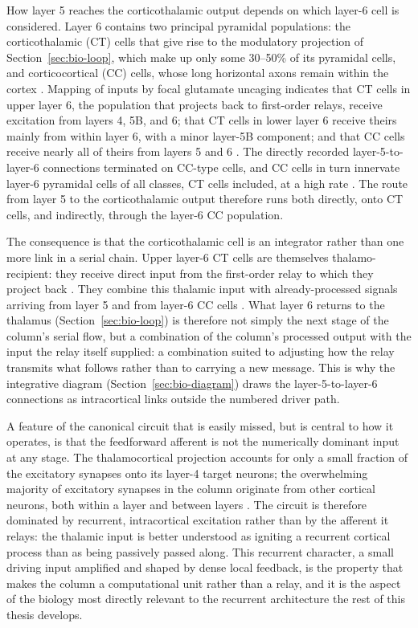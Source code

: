 How layer 5 reaches the corticothalamic output depends on which layer-6 cell is considered. Layer 6 contains two principal pyramidal 
populations: the corticothalamic (CT) cells that give rise to the modulatory projection of Section~\ref{sec:bio-loop}, which make up only some 30--50\% of its pyramidal cells, and corticocortical (CC) cells, whose long horizontal axons remain within the cortex \parencite{thomson2010layer6}. Mapping of inputs by focal glutamate uncaging indicates that CT cells in upper layer 6, the population that projects back to first-order relays, receive excitation from layers 4, 5B, and 6; that CT cells in lower layer 6 receive theirs mainly from within layer 6, with a minor layer-5B component; and that CC cells receive nearly all of theirs from layers 5 and 6 \parencite{thomson2010layer6}. The directly recorded layer-5-to-layer-6 connections terminated on CC-type cells, and CC cells in turn innervate layer-6 pyramidal cells of all classes, CT cells included, at a high rate \parencite{thomson2010layer6}. The route from layer 5 to the corticothalamic output therefore runs both directly, onto CT cells, and indirectly, through the layer-6 CC population.

The consequence is that the corticothalamic cell is an integrator rather than one more link in a serial chain. Upper layer-6 CT cells 
are themselves thalamo-recipient: they receive direct input from the first-order relay to which they project back \parencite{thomson2010layer6, constantinople2013}. They combine this thalamic input with already-processed signals arriving from layer 5 and from layer-6 CC cells \parencite{thomson2010layer6}. What layer 6 returns to the thalamus (Section~\ref{sec:bio-loop}) is therefore not simply the next stage of the column's serial flow, but a combination of the column's processed output with the input the relay itself supplied: a combination suited to adjusting how the relay transmits what follows rather than to carrying a new message. This is why the integrative diagram (Section~\ref{sec:bio-diagram}) draws the layer-5-to-layer-6 connections as intracortical links outside the numbered driver path.

A feature of the canonical circuit that is easily missed, but is central to how it operates, is that the feedforward afferent is not 
the numerically dominant input at any stage. The thalamocortical projection accounts for only a small fraction of the excitatory synapses onto its layer-4 target neurons; the overwhelming majority of excitatory synapses in the column originate from other cortical neurons, both within a layer and between layers \parencite{douglas2004}. The circuit is therefore dominated by recurrent, intracortical excitation rather than by the afferent it relays: the thalamic input is better understood as igniting a recurrent cortical process than as being passively passed along. This recurrent character, a small driving input amplified and shaped by dense local feedback, is the property that makes the column a computational unit rather than a relay, and it is the aspect of the biology most directly relevant to the recurrent architecture the rest of this thesis develops.

